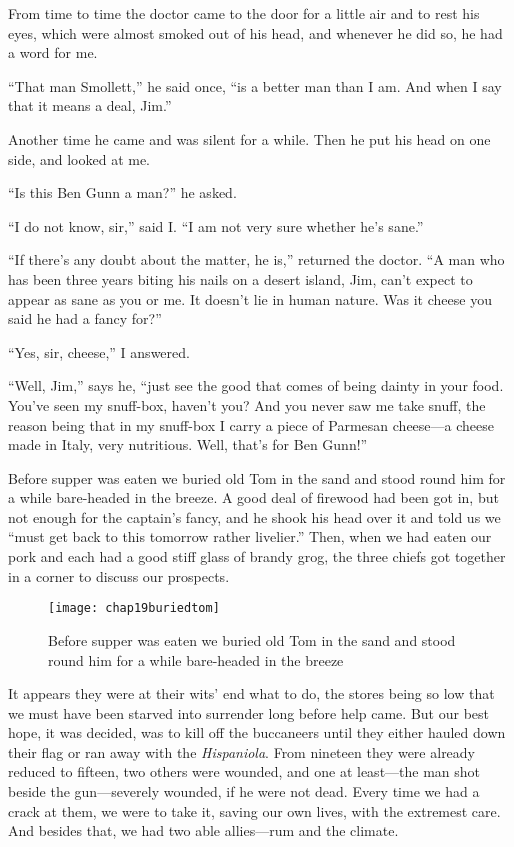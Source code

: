 From time to time the doctor came to the door for a little air and to rest his eyes, which were almost smoked out of his head, and whenever he did so, he had a word for me.

\enquote{That man Smollett,} he said once, \enquote{is a better man than I am. And when I say that it means a deal, Jim.}

Another time he came and was silent for a while. Then he put his head on one side, and looked at me.

\enquote{Is this Ben Gunn a man?} he asked.

\enquote{I do not know, sir,} said I. \enquote{I am not very sure whether he’s sane.}

\enquote{If there’s any doubt about the matter, he is,} returned the doctor. \enquote{A man who has been three years biting his nails on a desert island, Jim, can’t expect to appear as sane as you or me. It doesn’t lie in human nature. Was it cheese you said he had a fancy for?}

\enquote{Yes, sir, cheese,} I answered.

\enquote{Well, Jim,} says he, \enquote{just see the good that comes of being dainty in your food. You’ve seen my snuff-box, haven’t you? And you never saw me take snuff, the reason being that in my snuff-box I carry a piece of Parmesan cheese---a cheese made in Italy, very nutritious. Well, that’s for Ben Gunn!}

Before supper was eaten we buried old Tom in the sand and stood round him for a while bare-headed in the breeze. A good deal of firewood had been got in, but not enough for the captain’s fancy, and he shook his head over it and told us we \enquote{must get back to this tomorrow rather livelier.} Then, when we had eaten our pork and each had a good stiff glass of brandy grog, the three chiefs got together in a corner to discuss our prospects.

  \begin{figure}[p]
\centering
\texttt{[image: chap19buriedtom]}
\caption[We buried old Tom in the sand]{Before supper was eaten we buried old Tom in the sand and stood round him for a while bare-headed in the breeze}
\end{figure} 

It appears they were at their wits’ end what to do, the stores being so low that we must have been starved into surrender long before help came. But our best hope, it was decided, was to kill off the buccaneers until they either hauled down their flag or ran away with the \textit{Hispaniola}. From nineteen they were already reduced to fifteen, two others were wounded, and one at least---the man shot beside the gun---severely wounded, if he were not dead. Every time we had a crack at them, we were to take it, saving our own lives, with the extremest care. And besides that, we had two able allies---rum and the climate.


